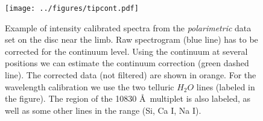 \begin{figure}[t]
\center
\texttt{[image: ../figures/tipcont.pdf]}
\caption{Example of intensity calibrated spectra from the \emph{polarimetric} data set on the disc near the limb. Raw spectrogram (blue line) has to be corrected for the continuum level. Using the continuum at several positions we can estimate the continuum correction (green dashed line). The corrected data (not filtered) are shown in orange. For the wavelength calibration we use the two telluric  $H_{2}O$ lines (labeled in the figure). The region of the  10830 \AA\  multiplet is also labeled, as well as some other lines in the range (Si, Ca I, Na I).}
\label{fig:tip:cont}
\end{figure}


